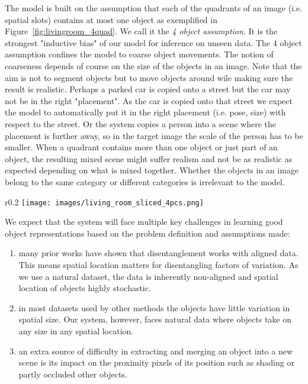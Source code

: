 \documentclass[a4paper,12pt]{report}
\begin{document}
The model is built on the assumption that each of the quadrants of an image (i.e. spatial slots) contains at most one object as exemplified in Figure~\ref{fig:livingroom_4quad}. We call it the \textit{4 object assumption}. It is the strongest "inductive bias" of our model for inference on unseen data. The 4 object assumption confines the model to coarse object movements. The notion of coarseness depends of course on the size of the objects in an image. Note that the aim is not to segment objects but to move objects around wile making sure the result is realistic. Perhaps a parked car is copied onto a street but the car may not be in the right "placement". As the car is copied onto that street we expect the model to automatically put it in the right placement (i.e. pose, size) with respect to the street. Or the system copies a person into a scene where the placement is further away, so in the target image the scale of the person has to be smaller. When a quadrant contains more than one object or just part of an object, the resulting mixed scene might suffer realism and not be as realistic as expected depending on what is mixed together. Whether the objects in an image belong to the same category or different categories is irrelevant to the model.
\begin{wrapfigure}{r}{0.2\textwidth}
\texttt{[image: images/living\_room\_sliced\_4pcs.png]} 
\caption{The 4 object assumption: 0 or 1 object per quadrant.} %
\label{fig:livingroom_4quad}
\end{wrapfigure}

We expect that the system will face multiple key challenges in learning good object representations based on the problem definition and assumptions made:
\begin{enumerate}
  \item many prior works have shown that disentanglement works with aligned data. This means spatial location matters for disentangling factors of variation. As we use a natural dataset, the data is inherently non-aligned and spatial location of objects highly stochastic.
  \item  in most datasets used by other methods the objects have little variation in spatial size. Our system, however, faces natural data where objects take on any size in any spatial location.
  \item an extra source of difficulty in extracting and merging an object into a new scene is its impact on the proximity pixels of its position such as shading or partly occluded other objects.
\end{enumerate}
\end{document}
